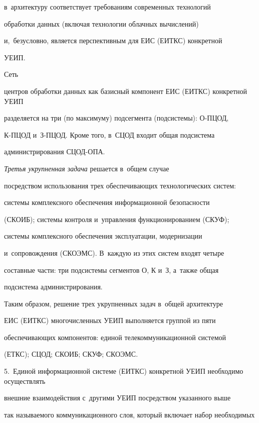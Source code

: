 в~архитектуру соответствует требованиям современных технологий 

обработки данных (включая технологии облачных вычислений) 

и,~безусловно, является перспективным для ЕИС (ЕИТКС) конкретной 

УЕИП.

     

Сеть 

центров обработки данных как базисный компонент ЕИС (ЕИТКС) конкретной УЕИП 

разделяется на три (по максимуму) подсегмента (подсистемы): О-ПЦОД,  

К-ПЦОД и~З-ПЦОД. Кроме того, в~СЦОД входит общая подсистема 

администрирования СЦОД-ОПА.

     

     \textit{Третья укрупненная задача} решается в~общем случае 

посредством использования трех обеспечивающих технологических систем: 

системы комплексного обеспечения информационной безопасности 

(СКОИБ); системы контроля и~управления функционированием (СКУФ); 

системы комплексного обеспечения эксплуатации, модернизации 

и~сопровождения (СКОЭМС). В~каждую из этих систем входят четыре 

составные части: три подсистемы сегментов О, К и~З, а~также общая 

подсистема администрирования.

     

     Таким образом, решение трех укрупненных задач в~общей архитектуре 

ЕИС (ЕИТКС) многочисленных УЕИП выполняется группой из пяти 

обеспечивающих компонентов: единой телекоммуникационной системой

(ЕТКС);  СЦОД;  СКОИБ;  СКУФ;  СКОЭМС.

     

     \smallskip

     

     5.\ Единой информационной системе (ЕИТКС) конкретной УЕИП необходимо осуществлять 

внешние взаимодействия с~другими УЕИП посредством указанного выше 

так называемого коммуникационного слоя, который включает набор необходимых 

